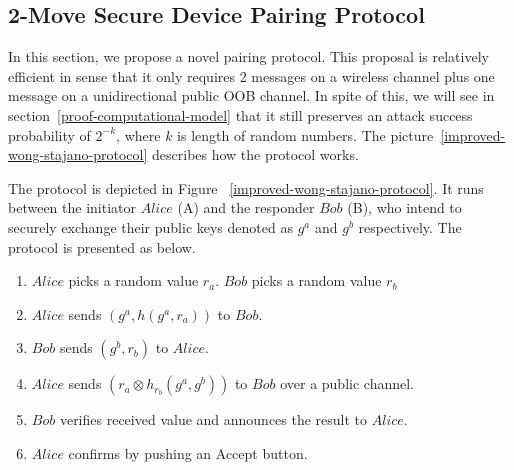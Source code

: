 \begin{enumerate}
\begin{enumerate}
\section{2-Move Secure Device Pairing Protocol}\label{chap42move}

In this section, we propose a novel pairing protocol. This proposal is relatively efficient in sense that it only requires 2 messages on a wireless channel plus one message on a unidirectional public OOB channel. In spite of this, we will see in section~\ref{proof-computational-model} that it still preserves an attack success probability of $2^{-k}$, where $k$ is length of random numbers. The picture~\ref{improved-wong-stajano-protocol} describes how the protocol works. 

The protocol is depicted in Figure ~\ref{improved-wong-stajano-protocol}. It runs between the initiator $Alice$ (A) and the responder $Bob$ (B), who intend to securely exchange their public keys denoted as $g^a$ and $g^b$ respectively. The protocol is presented as below.

\begin{enumerate}
\item $Alice$ picks a random value $r_a$. $Bob$ picks a random value $r_b$
\item $Alice$ sends $(g^a,h(g^a,r_a))$ to $Bob$.
\item $Bob$ sends $(g^b,r_b)$ to $Alice$.
\item $Alice$ sends $(r_a \otimes h_{r_b}(g^a,g^b) )$ to $Bob$ over a public channel. 
\item $Bob$ verifies received value and announces the result to $Alice$. 
\item $Alice$ confirms by pushing an Accept button. 
\end{enumerate}

\begin{figure}[b]
\begin{center}
\end{center}
\end{figure}
\end{enumerate}
\end{enumerate}
